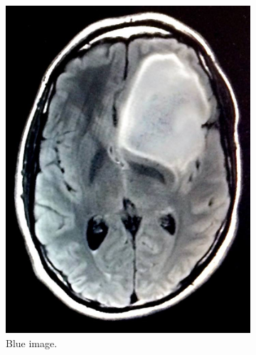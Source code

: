 \documentclass[abstracton]{scrreprt}
\begin{document}
            \begin{figure}[!ht]
                \centering
                \begin{subfigure}[b]{0.3\textwidth}
                    \includegraphics[width=\textwidth]{img/images/keating.jpg}
                    \caption{Blue image.}
                \end{subfigure}
                \begin{subfigure}[b]{0.3\textwidth}

\end{subfigure}
\end{figure}
\end{document}
